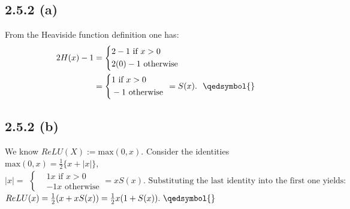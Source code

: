 \documentclass{exam}
\begin{document}
\subsection*{2.5.2 (a)}
From the Heaviside function definition one has: 
\begin{equation*}
    \begin{aligned}
        2H(x) -1 &= 
        \left\{
        \begin{aligned}
            &2 - 1 \text{ if } x > 0 \\
            &2(0)-1 \text{ otherwise}
        \end{aligned}
        \right. \\
        &= \left\{
            \begin{aligned}
                &1 \text{ if } x > 0 \\
                &-1 \text{ otherwise}
            \end{aligned}
        \right. \ 
        = S(x). \text{ \ \qedsymbol{}}
    \end{aligned}    
\end{equation*}

\subsection*{2.5.2 (b)}
We know $ReLU(X):= \text{max}(0,x)$. Consider the identities $\text{max}(0,x) = \frac{1}{2} \{ x + |x| \}$, \\
\begin{equation*}
    |x| = 
    \begin{aligned}
        \left\{
        \begin{aligned}
            &1 x \text{ if } x > 0 \\
            &-1 x \text{ otherwise}
        \end{aligned}
        \right. = x S(x) \text{. Substituting the last identity into the first one yields: }
    \end{aligned}
\end{equation*}
$ReLU(x) = \frac{1}{2}(x + x S(x)) = \frac{1}{2}x(1 + S(x)). \ \qedsymbol{}$    
\end{document}
